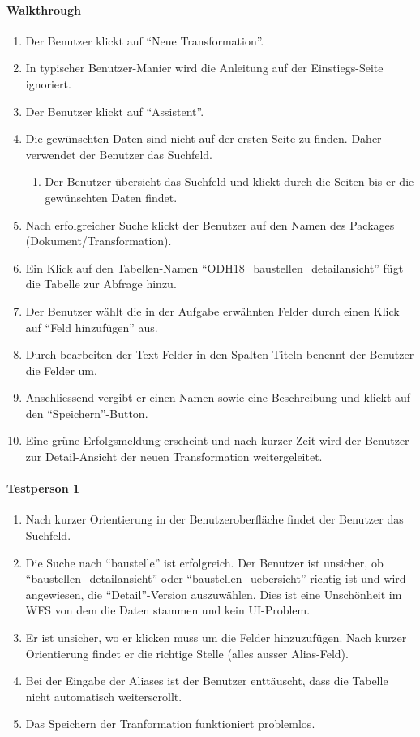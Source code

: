 \paragraph{Walkthrough}
\begin{enumerate}
\item Der Benutzer klickt auf ``Neue Transformation''.
\item In typischer Benutzer-Manier wird die Anleitung auf der Einstiegs-Seite ignoriert.
\item Der Benutzer klickt auf ``Assistent''.
\item \label{ui-test-assist-begin} Die gewünschten Daten sind nicht auf der ersten Seite zu finden. Daher verwendet der Benutzer das Suchfeld.
  \begin{enumerate}[label=\labelenumi\alph*.]
  \item Der Benutzer übersieht das Suchfeld und klickt durch die Seiten bis er die gewünschten Daten findet.
  \end{enumerate}
\item Nach erfolgreicher Suche klickt der Benutzer auf den Namen des Packages (Dokument/Transformation).
\item Ein Klick auf den Tabellen-Namen ``ODH18\_baustellen\_detailansicht'' fügt die Tabelle zur Abfrage hinzu.
\item Der Benutzer wählt die in der Aufgabe erwähnten Felder durch einen Klick auf ``Feld hinzufügen'' aus.
\item \label{ui-test-assist-end}Durch bearbeiten der Text-Felder in den Spalten-Titeln benennt der Benutzer die Felder um.
\item Anschliessend vergibt er einen Namen sowie eine Beschreibung und klickt auf den ``Speichern''-Button.
\item Eine grüne Erfolgsmeldung erscheint und nach kurzer Zeit wird der Benutzer zur Detail-Ansicht der neuen Transformation weitergeleitet.
\end{enumerate}

\paragraph{Testperson 1}
\begin{enumerate}
\item Nach kurzer Orientierung in der Benutzeroberfläche findet der Benutzer das Suchfeld.
\item Die Suche nach ``baustelle'' ist erfolgreich. Der Benutzer ist unsicher, ob ``baustellen\_detailansicht'' oder ``baustellen\_uebersicht'' richtig ist und wird angewiesen, die ``Detail''-Version auszuwählen. Dies ist eine Unschönheit im WFS von dem die Daten stammen und kein UI-Problem.
\item Er ist unsicher, wo er klicken muss um die Felder hinzuzufügen. Nach kurzer Orientierung findet er die richtige Stelle (alles ausser Alias-Feld).
\item Bei der Eingabe der Aliases ist der Benutzer enttäuscht, dass die Tabelle nicht automatisch weiterscrollt. 
\item Das Speichern der Tranformation funktioniert problemlos.
\end{enumerate}

